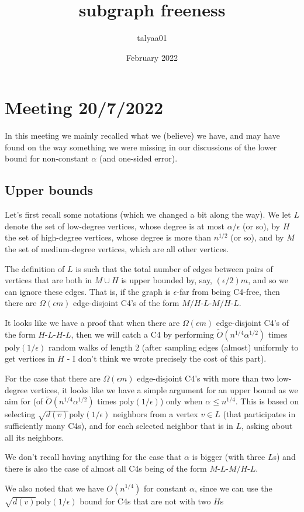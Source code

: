 \documentclass{article}
\title{subgraph freeness}
\author{talyaa01}
\date{February 2022}
\newcommand{\eps}{\epsilon}
\newcommand{\poly}{\textrm{poly}}
\begin{document}
\section{Meeting 20/7/2022}

In this meeting we mainly recalled what we (believe) we have, and may have found on the way something we were missing in our discussions of the lower bound for non-constant $\alpha$ (and one-sided error).

\subsection{Upper bounds}

Let's first recall some notations (which we changed a bit along the way). We let $L$ denote the set of low-degree vertices, whose degree is at most $\alpha/\eps$ (or so), by $H$ the set of high-degree vertices, whose degree is more than $n^{1/2}$ (or so), and by $M$ the set of medium-degree vertices, which are all other vertices.

The definition of $L$ is such that the total number of edges between pairs of vertices that are both in $M\cup H$ is upper bounded by, say, $(\eps/2)m$, and so we can ignore these edges. That is, if the graph is $\eps$-far from being C4-free, then there are $\Omega(\eps m)$ edge-disjoint C4's of the form $M/H$-$L$-$M/H$-$L$.

It looks like we have a proof that when there are $\Omega(\eps m)$ edge-disjoint C4's of the form $H$-$L$-$H$-$L$, then we will catch a C4 by performing $\tilde{O}(n^{1/4}\alpha^{1/2})$ times $\poly(1/\eps)$ random walks of length $2$ (after sampling edges (almost) uniformly to get vertices in $H$ - I don't think we wrote precisely the cost of this part).

For the case that there are $\Omega(\eps m)$ edge-disjoint C4's with more than two low-degree vertices, it looks like we have a simple argument for an upper bound as we aim for (of $\tilde{O}(n^{1/4}\alpha^{1/2})$ times $\poly(1/\eps)$) only when $\alpha \leq n^{1/4}$.  This is based on selecting $\sqrt{d(v)}\poly(1/\eps)$ neighbors from a vertex $v \in L$ (that participates in sufficiently many C4s), and for each selected neighbor that is in $L$,  asking about all its neighbors.

We don't recall having anything for the case that $\alpha$ is bigger (with three $L$s) and there is also the case of almost all C4s being of the form $M$-$L$-$M/H$-$L$.

We also noted that we have $O(n^{1/4})$ for constant $\alpha$, since we can use the $\sqrt{d(v)}\poly(1/\eps)$ bound for C4s that are not with two $H$s
\end{document}
